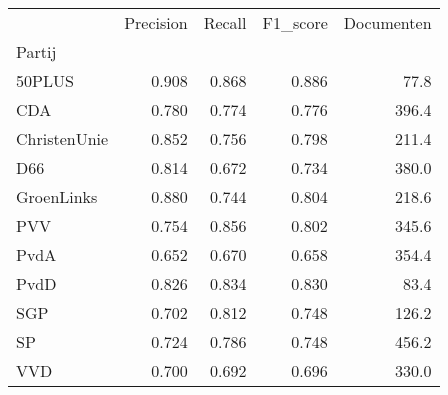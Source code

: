 \begin{tabular}{lrrrr}
\toprule
{} &  Precision &  Recall &  F1\_score &  Documenten \\
Partij       &            &         &           &             \\
\midrule
50PLUS       &      0.908 &   0.868 &     0.886 &        77.8 \\
   CDA       &      0.780 &   0.774 &     0.776 &       396.4 \\
ChristenUnie &      0.852 &   0.756 &     0.798 &       211.4 \\
   D66       &      0.814 &   0.672 &     0.734 &       380.0 \\
  GroenLinks &      0.880 &   0.744 &     0.804 &       218.6 \\
   PVV       &      0.754 &   0.856 &     0.802 &       345.6 \\
  PvdA       &      0.652 &   0.670 &     0.658 &       354.4 \\
  PvdD       &      0.826 &   0.834 &     0.830 &        83.4 \\
   SGP       &      0.702 &   0.812 &     0.748 &       126.2 \\
    SP       &      0.724 &   0.786 &     0.748 &       456.2 \\
   VVD       &      0.700 &   0.692 &     0.696 &       330.0 \\
\bottomrule
\end{tabular}
